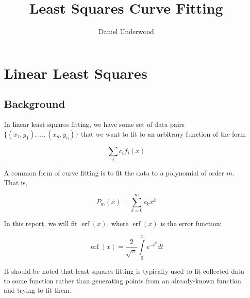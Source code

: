 \documentclass[10pt,a4paper]{article}
\author{Daniel Underwood}
\title{Least Squares Curve Fitting}
\DeclareMathOperator\erf{erf}
\begin{document}

\maketitle


\section*{Linear Least Squares}

\subsection*{Background}

In linear least squares fitting, we have some set of data pairs $\{ (x_1, y_1), ... , (x_n, y_n)\}$ that we want to fit to an arbitrary function of the form

\begin{equation}
\sum\limits_i c_i f_i(x)
\label{eqn: arbitrary fit}
\end{equation}

A common form of curve fitting is to fit the data to a polynomial of order $m$. That is,

\begin{equation}
P_m(x) = \sum\limits_{k=0}^m c_k x^k
\label{eqn: general polynomial}
\end{equation}

In this report, we will fit $\erf{(x)}$, where $\erf{(x)}$ is the error function:

\begin{equation}
\erf{(x)} = \frac{2}{\sqrt{\pi}} \int\limits_0^x e^{-t^2} dt
\label{eqn: error function}
\end{equation}

It should be noted that least squares fitting is typically used to fit collected data to some function rather than generating points from an already-known function and trying to fit them.
\end{document}
